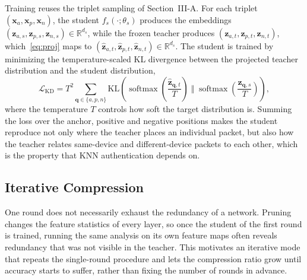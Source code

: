 \documentclass[journal,comsoc]{IEEEtran}
\begin{document}
Training reuses the triplet sampling of Section~III-A. For each triplet $(\mathbf{x}_a, \mathbf{x}_p, \mathbf{x}_n)$, the student $f_s(\cdot;\theta_s)$ produces the embeddings $(\mathbf{z}_{a,s}, \mathbf{z}_{p,s}, \mathbf{z}_{n,s}) \in \mathbb{R}^{d_s}$, while the frozen teacher produces $(\mathbf{z}_{a,t}, \mathbf{z}_{p,t}, \mathbf{z}_{n,t})$, which~\eqref{eq:proj} maps to $(\hat{\mathbf{z}}_{a,t}, \hat{\mathbf{z}}_{p,t}, \hat{\mathbf{z}}_{n,t}) \in \mathbb{R}^{d_s}$. The student is trained by minimizing the temperature-scaled KL divergence between the projected teacher distribution and the student distribution,
\begin{equation}
\label{eq:kd}
\mathcal{L}_{\text{KD}} =
T^2 \sum_{\mathbf{q} \in \{a,p,n\}}
\mathrm{KL}\!\left(
\operatorname{softmax}\!\left(\frac{\hat{\mathbf{z}}_{\mathbf{q},t}}{T}\right)
\;\Big\Vert\;
\operatorname{softmax}\!\left(\frac{\mathbf{z}_{\mathbf{q},s}}{T}\right)
\right),
\end{equation}
where the temperature $T$ controls how soft the target distribution is. Summing the loss over the anchor, positive and negative positions makes the student reproduce not only where the teacher places an individual packet, but also how the teacher relates same-device and different-device packets to each other, which is the property that KNN authentication depends on.

\subsection{Iterative Compression}

One round does not necessarily exhaust the redundancy of a network. Pruning changes the feature statistics of every layer, so once the student of the first round is trained, running the same analysis on its own feature maps often reveals redundancy that was not visible in the teacher. This motivates an iterative mode that repeats the single-round procedure and lets the compression ratio grow until accuracy starts to suffer, rather than fixing the number of rounds in advance.
\end{document}

